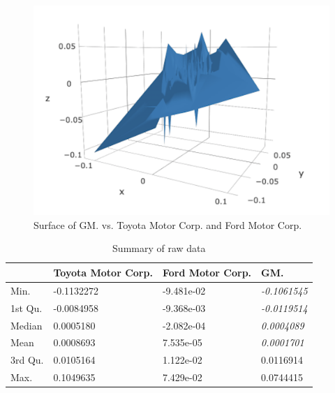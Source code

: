 \begin{figure}
\includegraphics[scale=0.3]{surface}
\caption{Surface of GM. vs. Toyota Motor Corp. and Ford Motor Corp.}
\label{img:surface}
\end{figure}

\begin{table}[]
\centering
\caption{Summary of raw data}
\label{tab:rawdata}
\begin{tabular}{l|lll}
        & \textbf{Toyota Motor Corp.} & \textbf{Ford Motor Corp.} & \textbf{GM.}        \\ \hline
Min.    & -0.1132272                  & -9.481e-02                & \textit{-0.1061545} \\
1st Qu. & -0.0084958                  & -9.368e-03                & \textit{-0.0119514} \\
Median  & 0.0005180                   & -2.082e-04                & \textit{0.0004089}  \\
Mean    & 0.0008693                   & 7.535e-05                 & \textit{0.0001701}  \\
3rd Qu. & 0.0105164                   & 1.122e-02                 & 0.0116914           \\
Max.    & 0.1049635                   & 7.429e-02                 & 0.0744415          
\end{tabular}
\end{table}

